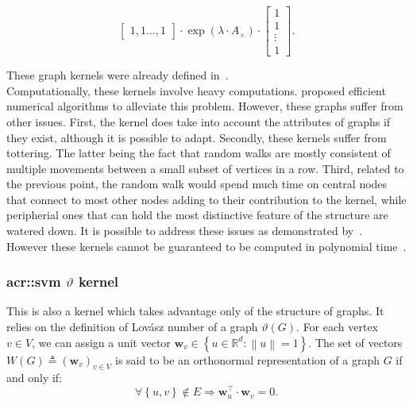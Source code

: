 \begin{itemize}
\begin{equation}
\begin{bmatrix}
                                    1, 1\dots,1
                                \end{bmatrix}\cdot \exp\left(\lambda\cdot A_{\times}\right)\cdot\begin{bmatrix}
                                    1\\
                                    1\\
                                    \vdots\\
                                    1
                                \end{bmatrix}.
                            \end{equation}
                \end{itemize}
                These graph kernels were already defined in~\parencite{gartner2003graph}.\\

            Computationally, these kernels involve heavy computations.
            \textcite{vishwanathan2010graph} proposed efficient numerical algorithms to alleviate this problem.
            However, these graphs suffer from other issues.
            First, the kernel does take into account the attributes of graphs if they exist, although it is possible to adapt.
            Secondly, these kernels suffer from tottering.
            The latter being the fact that random walks are mostly consistent of multiple movements between a small subset of vertices in a row.
            Third, related to the previous point, the random walk would spend much time on central nodes that connect to most other nodes adding to their contribution to the kernel, while peripherial ones that can hold the most distinctive feature of the structure are watered down.
            It is possible to address these issues as demonstrated by~\textcite{horvath2004cyclic, mahe2004extensions}.
            However these kernels cannot be guaranteed to be computed in polynomial time~\parencite{vishwanathan2010graph}.

        \subsubsection{\gls*{acr::svm} $\vartheta$ kernel}
            This is also a kernel which takes advantage only of the structure of graphs.
            It relies on the definition of Lov\'asz number of a graph $\vartheta(G)$.
            For each vertex $v \in V$, we can assign a unit vector \(\bm{w}_v \in \left\{u \in \mathbb{R}^d: \left\lVert u \right\rVert = 1 \right\}\).
            The set of vectors \(W(G) \triangleq \left(\bm{w}_v\right)_{v \in V}\) is said to be an orthonormal representation of a graph $G$ if and only if:
            \begin{equation*}
                \forall \left\{u,v\right\} \notin E \Rightarrow \bm{w}_u^\intercal\cdot \bm{w}_v=0.
            \end{equation*}

